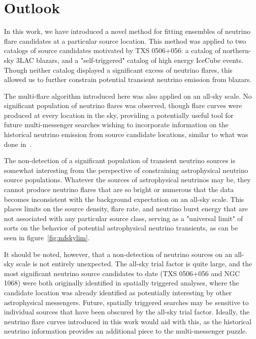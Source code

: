 \chapter{Outlook}\label{chapter:outlook}

In this work, we have introduced a novel method for fitting ensembles of neutrino flare candidates at a particular source location. This method was applied to two catalogs of source candidates motivated by TXS 0506+056: a catalog of northern-sky 3LAC blazars, and a "self-triggered" catalog of high energy IceCube events. Though neither catalog displayed a significant excess of neutrino flares, this allowed us to further constrain potential transient neutrino emission from blazars. 

The multi-flare algorithm introduced here was also applied on an all-sky scale. No significant population of neutrino flares was observed, though flare curves were produced at every location in the sky, providing a potentially useful tool for future multi-messenger searches wishing to incorporate information on the historical neutrino emission from source candidate locations, similar to what was done in~\cite{TXS_Archival}. 

The non-detection of a significant population of transient neutrino sources is somewhat interesting from the perspective of constraining astrophysical neutrino source populations. Whatever the sources of astrophysical neutrinos may be, they cannot produce neutrino flares that are so bright or numerous that the data becomes inconsistent with the background expectation on an all-sky scale. This places limits on the source density, flare rate, and neutrino burst energy that are not associated with any particular source class, serving as a "universal limit" of sorts on the behavior of potential astrophysical neutrino transients, as can be seen in figure~\ref{fig:mfskylim}. 

It should be noted, however, that a non-detection of neutrino sources on an all-sky scale is not entirely unexpected. The all-sky trial factor is quite large, and the most significant neutrino source candidates to date (TXS 0506+056 and NGC 1068) were both originally identified in spatially triggered analyses, where the candidate location was already identified as potentially interesting by other astrophysical messengers. Future, spatially triggered searches may be sensitive to individual sources that have been obscured by the all-sky trial factor. Ideally, the neutrino flare curves introduced in this work would aid with this, as the historical neutrino information provides an additional piece to the multi-messenger puzzle. 

